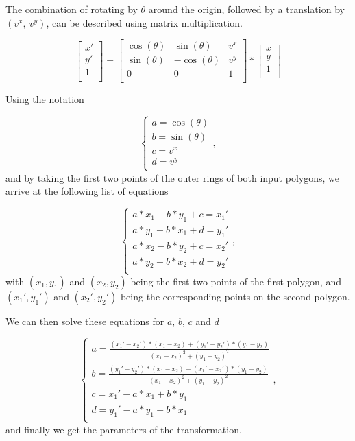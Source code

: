 The combination of rotating by $\theta$ around the origin, followed by a translation by $(v^x,\ v^y)$, can be described using matrix multiplication.

\[
    \begin{bmatrix}
    x' \\
    y' \\ 
    1  \\       
    \end{bmatrix}
    =
    \begin{bmatrix}
    \cos(\theta) & \sin(\theta)  & v^x \\
    \sin(\theta) & -\cos(\theta) & v^y \\ 
    0            & 0             & 1   \\       
    \end{bmatrix}
    *
    \begin{bmatrix}
    x \\
    y \\ 
    1 \\       
    \end{bmatrix}
\]

Using the notation

\[
    \begin{cases}
        a = \cos(\theta) \\
        b = \sin(\theta) \\
        c = v^x          \\
        d = v^y          \\
    \end{cases}, 
\]
and by taking the first two points of the outer rings of both input polygons, we arrive at the following list of equations

\[
    \begin{cases}
        a*x_1 - b*y_1 + c = x_1' \\
        a*y_1 + b*x_1 + d = y_1' \\
        a*x_2 - b*y_2 + c = x_2' \\
        a*y_2 + b*x_2 + d = y_2' \\
    \end{cases}, 
\]
with $(x_1, y_1)$ and $(x_2, y_2)$ being the first two points of the first polygon, and $(x_1', y_1')$ and $(x_2', y_2')$ being the corresponding points on the second polygon.

We can then solve these equations for $a$, $b$, $c$ and $d$

\[
    \begin{cases}
        a = \frac{(x_1' - x_2')*(x_1 - x_2) + (y_1' - y_2')*(y_1 - y_2)}{(x_1 - x_2)^2 + (y_1 - y_2)^2}\\
        b = \frac{(y_1' - y_2')*(x_1 - x_2) - (x_1' - x_2')*(y_1 - y_2)}{(x_1 - x_2)^2 + (y_1 - y_2)^2}\\
        c = x_1' - a*x_1 + b*y_1 \\
        d = y_1' - a*y_1 - b*x_1 \\
    \end{cases}, 
\]
and finally we get the parameters of the transformation.

